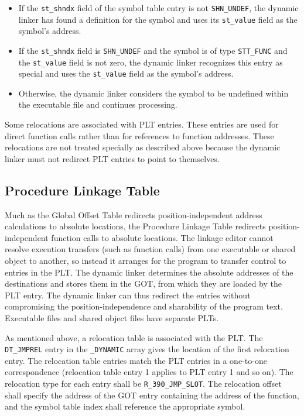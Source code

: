 \documentclass[english,11pt,twoside,toc=bib,toc=idx]{scrreprt}
\begin{document}
\begin{itemize}
\item If the \texttt{st\_shndx} field of the symbol table entry is not
  \texttt{SHN\_UNDEF}, the dynamic linker has found a definition for
  the symbol and uses its \texttt{st\_value} field as the symbol's
  address.
\item If the \texttt{st\_shndx} field is \texttt{SHN\_UNDEF} and the
  symbol is of type \texttt{STT\_FUNC} and the \texttt{st\_value}
  field is not zero, the dynamic linker recognizes this entry as
  special and uses the \texttt{st\_value} field as the symbol's
  address.
\item Otherwise, the dynamic linker considers the symbol to be
  undefined within the executable file and continues processing.
\end{itemize}

Some relocations are associated with PLT entries.  These entries are
used for direct function calls rather than for references to function
addresses.  These relocations are not treated specially as described
above because the dynamic linker must not redirect PLT entries to
point to themselves.

\subsection{Procedure Linkage Table}
\label{procedurelinkagetable}
Much as the Global Offset Table redirects position-independent address
calculations to absolute locations, the Procedure Linkage Table
redirects position-independent function calls to absolute
locations.  The linkage editor cannot resolve execution transfers (such
as function calls) from one executable or shared object to another, so
instead it arranges for the program to transfer control to entries in
the PLT\@.  The dynamic linker determines the absolute addresses of the
destinations and stores them in the GOT, from which they are loaded by
the PLT entry.  The dynamic linker can thus redirect the entries
without compromising the position-independence and sharability of the
program text.  Executable files and shared object files have separate
PLTs.

As mentioned above, a relocation table is associated with the PLT\@.
The \texttt{DT\_JMPREL} entry in the \texttt{\_DYNAMIC} array gives
the location of the first relocation entry.  The relocation table
entries match the PLT entries in a one-to-one correspondence
(relocation table entry 1 applies to PLT entry 1 and so on).  The
relocation type for each entry shall be
\texttt{R\_390\_JMP\_SLOT}.  The relocation offset shall specify the
address of the GOT entry containing the address of the function, and
the symbol table index shall reference the appropriate symbol.
\end{document}
